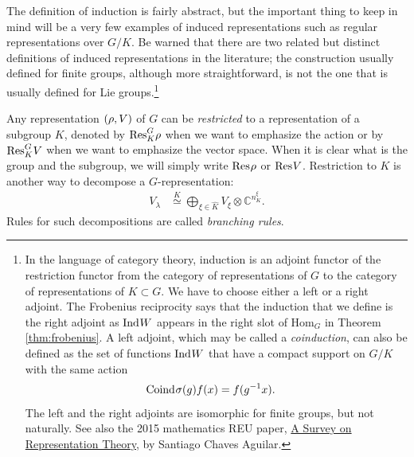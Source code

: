 The definition of induction is fairly abstract, but the important thing to keep in mind will be a very few examples of induced representations such as regular representations over $G/K$. Be warned that there are two related but distinct definitions of induced representations in the literature; the construction usually defined for finite groups, although more straightforward, is not the one that is usually defined for Lie groups.\footnote{In the language of category theory, induction is an adjoint functor of the restriction functor from the category of representations of $G$ to the category of representations of $K \subset G$. We have to choose either a left or a right adjoint. The Frobenius reciprocity says that the induction that we define is the right adjoint as $\ind{W}{}{}$ appears in the right slot of $\text{Hom}_G$ in Theorem \ref{thm:frobenius}. A left adjoint, which may be called a \emph{coinduction}, can also be defined as the set of functions $\ind{W}{}{}$ that have a compact support on $G/K$ with the same action
\begin{align}
	\coind{\krep(g)}{}{}f(x) &= f(g^{-1}x).
\end{align}
The left and the right adjoints are isomorphic for finite groups, but not naturally. See also the 2015 mathematics REU paper, \href{http://math.uchicago.edu/~may/REU2015/REUPapers/Chaves.pdf}{A Survey on Representation Theory},  by Santiago Chaves Aguilar.}

Any representation $(\rep,V)$ of $G$ can be \emph{restricted} to a representation of a subgroup $K$, denoted by $\res{\rep}{G}{K}$ when we want to emphasize the action or by $\res{V}{G}{K}$ when we want to emphasize the vector space. When it is clear what is the group and the subgroup, we will  simply write $\res{\rep}{}{}$ or $\res{V}{}{}$. Restriction to $K$ is another way to decompose a $G$-representation:
\begin{align}
	V_{\lambda} &\stackrel{K}{\simeq} \bigoplus_{\xi \in \hat{K}} V_{\xi} \otimes \mathbb{C}^{n^{\xi}_K}.
\end{align}
Rules for such decompositions are called \emph{branching rules}.

